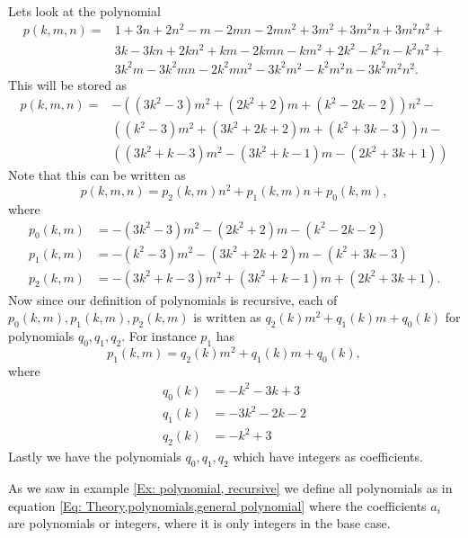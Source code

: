 \begin{example}\label{Ex: polynomial, recursive}
  Lets look at the polynomial
  \begin{equation*}
    \begin{split}
      p(k,m,n) = &1+3n+2n^2-m-2mn-2mn^2+3m^2+3m^2n+3m^2n^2+\\
      &3k-3kn+2kn^2+km-2kmn-km^2+2k^2-k^2n-k^2n^2+\\
      &3k^2m-3k^2mn-2k^2mn^2-3k^2m^2-k^2m^2n-3k^2m^2n^2.
    \end{split}
  \end{equation*}
  This will be stored as
  \begin{equation*}
    \begin{split}
      p(k,m,n) =  &-((3k^2-3)m^2+(2k^2+2)m+(k^2-2k-2))n^2-\\
                  &((k^2-3)m^2+(3k^2+2k+2)m+(k^2+3k-3))n-\\
                  &((3k^2+k-3)m^2-(3k^2+k-1)m-(2k^2+3k+1))
    \end{split}
  \end{equation*}
  Note that this can be written as
  \begin{equation*}
    p(k,m,n) = p_2(k,m)n^2+p_1(k,m)n+p_0(k,m),
  \end{equation*}
  where
  \begin{equation*}
    \begin{split}
      p_0(k,m) &= -(3k^2-3)m^2-(2k^2+2)m-(k^2-2k-2)\\
      p_1(k,m) &= -(k^2-3)m^2-(3k^2+2k+2)m-(k^2+3k-3)\\
      p_2(k,m) &= -(3k^2+k-3)m^2+(3k^2+k-1)m+(2k^2+3k+1).
    \end{split}
  \end{equation*}
  Now since our definition of polynomials is recursive, each of $p_0(k,m),p_1(k,m),p_2(k,m)$ is written as $q_2(k)m^2+q_1(k)m+q_0(k)$ for polynomials $q_0,q_1,q_2$. For instance $p_1$ has
  \begin{equation*}
    p_1(k,m) = q_2(k)m^2+q_1(k)m+q_0(k),
  \end{equation*}
  where
  \begin{equation*}
    \begin{split}
      q_0(k) & = -k^2-3k+3 \\
      q_1(k) & = -3k^2-2k-2 \\
      q_2(k) & = -k^2+3
    \end{split}
  \end{equation*}
  Lastly we have the polynomials $q_0,q_1,q_2$ which have integers as coefficients.
\end{example}
As we saw in example \ref{Ex: polynomial, recursive} we define all polynomials as in equation \ref{Eq: Theory,polynomials,general polynomial} where the coefficients $a_i$ are polynomials or integers, where it is only integers in the base case.

